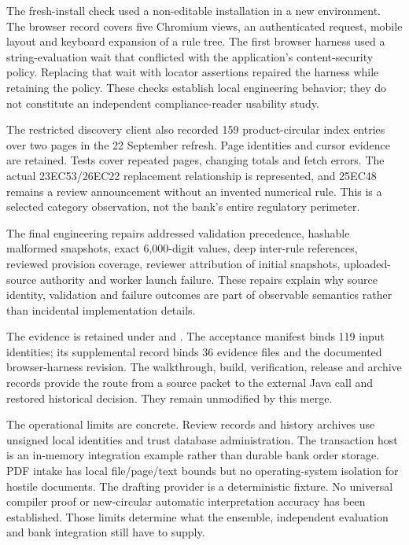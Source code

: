 \documentclass[12pt,a4paper,oneside,openany]{book}
\begin{document}
The fresh-install check used a non-editable installation in a new environment.
The browser record covers five Chromium views, an authenticated request, mobile
layout and keyboard expansion of a rule tree. The first browser harness used a
string-evaluation wait that conflicted with the application's content-security
policy. Replacing that wait with locator assertions repaired the harness while
retaining the policy. These checks establish local engineering behavior; they
do not constitute an independent compliance-reader usability study.

The restricted discovery client also recorded 159 product-circular index
entries over two pages in the 22 September refresh. Page identities and cursor
evidence are retained. Tests cover repeated pages, changing totals and fetch
errors. The actual 23EC53/26EC22 replacement relationship is represented, and
25EC48 remains a review announcement without an invented numerical rule. This
is a selected category observation, not the bank's entire regulatory perimeter.

The final engineering repairs addressed validation precedence, hashable malformed
snapshots, exact 6,000-digit values, deep inter-rule references, reviewed provision
coverage, reviewer attribution of initial snapshots, uploaded-source authority
and worker launch failure. These repairs explain why source identity, validation
and failure outcomes are part of observable semantics rather than incidental
implementation details.

The evidence is retained under  and
. The acceptance manifest binds 119 input
identities; its supplemental record binds 36 evidence files and the documented
browser-harness revision. The walkthrough, build, verification, release and
archive records provide the route from a source packet to the external Java
call and restored historical decision. They remain unmodified by this merge.

The operational limits are concrete. Review records and history archives use
unsigned local identities and trust database administration. The transaction
host is an in-memory integration example rather than durable bank order
storage. PDF intake has local file/page/text bounds but no operating-system
isolation for hostile documents. The drafting provider is a deterministic
fixture. No universal compiler proof or new-circular automatic interpretation
accuracy has been established. Those limits determine what the ensemble,
independent evaluation and bank integration still have to supply.
\end{document}
